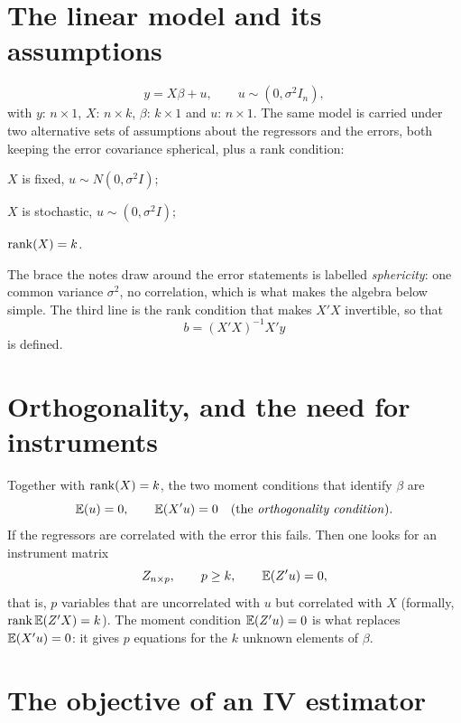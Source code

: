 \documentclass[11pt]{article}
\begin{document}

\section{The linear model and its assumptions}

\[ y=X\beta+u,\qquad u\sim(0,\sigma^{2}I_n), \]
with $y$: $n\times1$, $X$: $n\times k$, $\beta$: $k\times1$ and $u$: $n\times1$. The
same model is carried under two alternative sets of assumptions about the
regressors and the errors, both keeping the error covariance spherical, plus a
rank condition:

\begin{flatlist}
  \item $X$ is fixed, \quad $u\sim N(0,\sigma^{2}I)$;
  \item $X$ is stochastic, \quad $u\sim(0,\sigma^{2}I)$;
  \item $\operatorname{rank}(X)=k$.
\end{flatlist}
The brace the notes draw around the error statements is labelled \emph{sphericity}:
one common variance $\sigma^{2}$, no correlation, which is what makes the algebra
below simple. The third line is the rank condition that makes $X'X$ invertible, so
that
\[ b=(X'X)^{-1}X'y \]
is defined.

\section{Orthogonality, and the need for instruments}

Together with $\operatorname{rank}(X)=k$, the two moment conditions that identify $\beta$ are
\[ \mathbb{E}(u)=0,\qquad \mathbb{E}(X'u)=0 \quad\text{(the \emph{orthogonality condition}).} \]
If the regressors are correlated with the error this fails. Then one looks for an
instrument matrix
\[ Z_{n\times p},\qquad p\ge k,\qquad \mathbb{E}(Z'u)=0, \]
that is, $p$ variables that are uncorrelated with $u$ but correlated with $X$
(formally, $\operatorname{rank}\mathbb{E}(Z'X)=k$). The moment condition $\mathbb{E}(Z'u)=0$ is what replaces $\mathbb{E}(X'u)=0$: it gives $p$ equations
for the $k$ unknown elements of $\beta$.

\section{The objective of an IV estimator}
\end{document}
